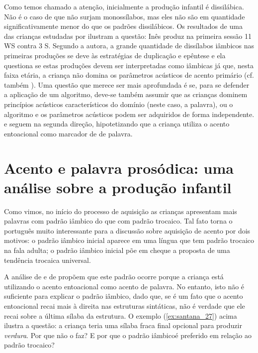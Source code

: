 \documentclass[output=paper]{LSP/langsci}
\begin{document}
Como temos chamado a atenção, inicialmente a produção infantil é dissilábica. Não é o caso de que não surjam monossílabos, mas eles não são em quantidade significativamente menor do que os padrões dissilábicos. Os resultados de uma das crianças estudadas por \citet{correia2009} ilustram a questão: Inês produz na primeira sessão 11 WS contra 3 S.  Segundo a autora, a grande quantidade de dissílabos iâmbicos nas primeiras produções se deve às estratégias de duplicação e epêntese e ela questiona se estas produções devem ser interpretadas como iâmbicas já que, nesta faixa etária, a criança não domina os parâmetros acústicos de acento primário (cf. também \citealt{gamarossi1999}). Uma questão que merece ser mais aprofundada é se, para se defender a aplicação de um algoritmo, deve-se também assumir que as crianças dominem princípios acústicos característicos do domínio (neste caso, a palavra), ou o algoritmo e os parâmetros acústicos podem ser adquiridos de forma independente. \citet{santos2001} e \citet{frotavigario2008} seguem na segunda direção, hipotetizando que a criança utiliza o acento entoacional como marcador de  de palavra.

\section{Acento e palavra prosódica: uma análise sobre a produção infantil}
\label{sec:santana_acento_pros_infantil}

Como vimos, no início do processo de aquisição as crianças apresentam mais palavras com padrão iâmbico do que com padrão trocaico. Tal fato torna o português muito interessante para a discussão sobre aquisição de acento por dois motivos: o padrão iâmbico inicial aparece em uma língua que tem padrão trocaico na fala adulta; o padrão iâmbico inicial põe em cheque a proposta de uma tendência trocaica universal.

A análise de \citet{santos2001} e de \citet{frotavigario2008} propõem que este padrão ocorre porque a criança está utilizando o acento entoacional como acento de palavra. No entanto, isto não é suficiente para explicar o padrão iâmbico, dado que, se é um fato que o acento entoacional recai mais à direita nas estruturas sintáticas, não é verdade que ele recai sobre a última sílaba da estrutura. O exemplo (\ref{ex:santana_27}) acima ilustra a questão: a criança teria uma sílaba fraca final opcional para produzir \textit{verdura}. Por que não o faz? E por que o padrão iâmbico\largerpage é preferido em relação ao padrão trocaico?
\end{document}
